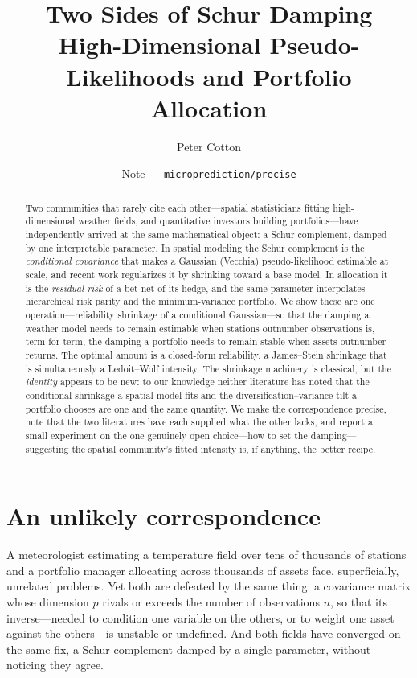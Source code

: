 \documentclass[11pt]{article}
\title{\vspace{-2em}Two Sides of Schur Damping\\[0.3em]
       \large High-Dimensional Pseudo-Likelihoods and Portfolio Allocation}
\author{Peter Cotton}
\date{Note --- \texttt{microprediction/precise}}
\begin{document}
\maketitle

\begin{abstract}
\noindent
Two communities that rarely cite each other---spatial statisticians fitting high-dimensional weather
fields, and quantitative investors building portfolios---have independently arrived at the same
mathematical object: a Schur complement, damped by one interpretable parameter. In spatial modeling
the Schur complement is the \emph{conditional covariance} that makes a Gaussian (Vecchia)
pseudo-likelihood estimable at scale, and recent work regularizes it by shrinking toward a base
model. In allocation it is the \emph{residual risk} of a bet net of its hedge, and the same parameter
interpolates hierarchical risk parity and the minimum-variance portfolio. We show these are one
operation---reliability shrinkage of a conditional Gaussian---so that the damping a weather model
needs to remain estimable when stations outnumber observations is, term for term, the damping a
portfolio needs to remain stable when assets outnumber returns. The optimal amount is a closed-form
reliability, a James--Stein shrinkage that is simultaneously a Ledoit--Wolf intensity. The shrinkage
machinery is classical, but the \emph{identity} appears to be new: to our knowledge neither literature
has noted that the conditional shrinkage a spatial model fits and the diversification--variance tilt a
portfolio chooses are one and the same quantity. We make the
correspondence precise, note that the two literatures have each supplied what the other lacks, and
report a small experiment on the one genuinely open choice---how to set the damping---suggesting the
spatial community's fitted intensity is, if anything, the better recipe.
\end{abstract}

\section{An unlikely correspondence}
A meteorologist estimating a temperature field over tens of thousands of stations and a portfolio
manager allocating across thousands of assets face, superficially, unrelated problems. Yet both are
defeated by the same thing: a covariance matrix whose dimension $p$ rivals or exceeds the number of
observations $n$, so that its inverse---needed to condition one variable on the others, or to weight
one asset against the others---is unstable or undefined. And both fields have converged on the same
fix, a Schur complement damped by a single parameter, without noticing they agree.
\end{document}
